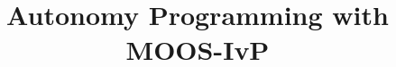 \documentclass[letterpaper,10pt,twocolumn]{book}
\begin{document}
\frontmatter

\begin{titlepage}
\title{Autonomy Programming with MOOS-IvP}
\date{}

\maketitle
\end{titlepage}

\tableofcontents

\mainmatter






\appendix






\backmatter

\end{document}
